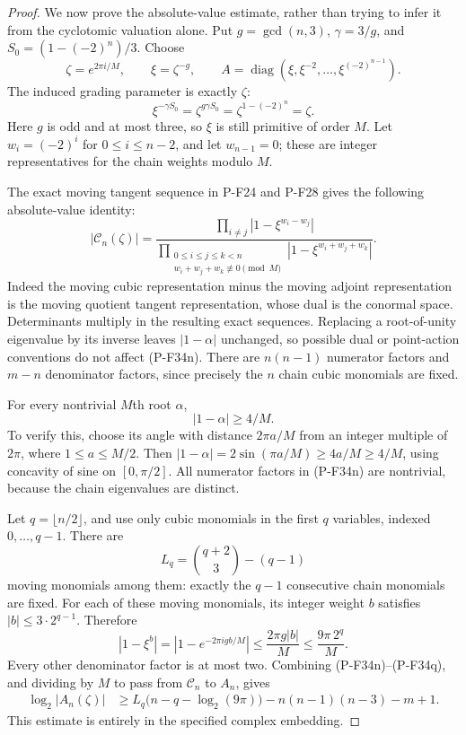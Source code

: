 \begin{proof}
We now prove the absolute-value estimate, rather than
trying to infer it from the cyclotomic valuation alone.
Put $g=\gcd(n,3)$, $\gamma=3/g$, and
$S_0=(1-(-2)^n)/3$. Choose
\[
 \zeta=e^{2\pi i/M},\qquad \xi=\zeta^{-g},\qquad
 A=\operatorname{diag}
        (\xi,\xi^{-2},\ldots,\xi^{(-2)^{n-1}}).
 \tag{P-F34m}
\]
The induced grading parameter is exactly $\zeta$:
\[
 \xi^{-\gamma S_0}=\zeta^{g\gamma S_0}
                 =\zeta^{1-(-2)^n}=\zeta.
\]
Here $g$ is odd and at most three, so $\xi$ is still
primitive of order $M$.
Let $w_i=(-2)^i$ for $0\le i\le n-2$, and let
$w_{n-1}=0$; these are integer representatives for the
chain weights modulo $M$.

The exact moving tangent sequence in P-F24 and P-F28
gives the following absolute-value identity:
\[
 |\mathcal C_n(\zeta)|
   =\frac{\displaystyle\prod_{i\ne j}
                     |1-\xi^{w_i-w_j}|}
          {\displaystyle\prod_{\substack{0\le i\le j\le k<n\\
                    w_i+w_j+w_k\not\equiv0\pmod M}}
                     |1-\xi^{w_i+w_j+w_k}|}.
 \tag{P-F34n}
\]
Indeed the moving cubic representation minus the moving
adjoint representation is the moving quotient tangent
representation, whose dual is the conormal space.
Determinants multiply in the resulting exact sequences.
Replacing a root-of-unity eigenvalue by its inverse
leaves $|1-\alpha|$ unchanged, so possible dual or
point-action conventions do not affect (P-F34n).
There are $n(n-1)$ numerator factors and $m-n$
denominator factors, since precisely the $n$ chain
cubic monomials are fixed.

For every nontrivial $M$th root $\alpha$,
\[
                         |1-\alpha|\ge4/M.
 \tag{P-F34o}
\]
To verify this, choose its angle with distance
$2\pi a/M$ from an integer multiple of $2\pi$,
where $1\le a\le M/2$. Then
$|1-\alpha|=2\sin(\pi a/M)\ge4a/M\ge4/M$,
using concavity of sine on $[0,\pi/2]$.
All numerator factors in (P-F34n) are nontrivial,
because the chain eigenvalues are distinct.

Let $q=\lfloor n/2\rfloor$, and use only cubic monomials
in the first $q$ variables, indexed $0,\ldots,q-1$.
There are
\[
 L_q=\binom{q+2}{3}-(q-1)
 \tag{P-F34p}
\]
moving monomials among them: exactly the $q-1$ consecutive
chain monomials are fixed. For each of these moving
monomials, its integer weight $b$ satisfies
$|b|\le3\cdot2^{q-1}$. Therefore
\[
 |1-\xi^b|=|1-e^{-2\pi igb/M}|
    \le \frac{2\pi g|b|}{M}
    \le \frac{9\pi\,2^q}{M}.
 \tag{P-F34q}
\]
Every other denominator factor is at most two.
Combining (P-F34n)--(P-F34q), and dividing by $M$
to pass from $\mathcal C_n$ to $A_n$, gives
\begin{align*}
 \log_2|A_n(\zeta)|
 &\ge L_q\bigl(n-q-\log_2(9\pi)\bigr)
       -n(n-1)(n-3)-m+1.
 \tag{P-F34r}
\end{align*}
This estimate is entirely in the specified complex
embedding.


\end{proof}
